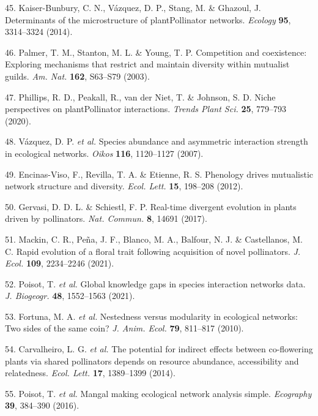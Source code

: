 \documentclass[12pt,a4paper,]{article}
\begin{document}
\hypertarget{ref-kaiser2014}{}
45. Kaiser-Bunbury, C. N., Vázquez, D. P., Stang, M. \& Ghazoul, J.
Determinants of the microstructure of plantPollinator networks.
\emph{Ecology} \textbf{95}, 3314--3324 (2014).

\hypertarget{ref-palmer2003}{}
46. Palmer, T. M., Stanton, M. L. \& Young, T. P. Competition and
coexistence: Exploring mechanisms that restrict and maintain diversity
within mutualist guilds. \emph{Am. Nat.} \textbf{162}, S63--S79 (2003).

\hypertarget{ref-phillips2020}{}
47. Phillips, R. D., Peakall, R., van der Niet, T. \& Johnson, S. D.
Niche perspectives on plantPollinator interactions. \emph{Trends Plant
Sci.} \textbf{25}, 779--793 (2020).

\hypertarget{ref-vazquez2007}{}
48. Vázquez, D. P. \emph{et al.} Species abundance and asymmetric
interaction strength in ecological networks. \emph{Oikos} \textbf{116},
1120--1127 (2007).

\hypertarget{ref-encinas2012}{}
49. Encinas-Viso, F., Revilla, T. A. \& Etienne, R. S. Phenology drives
mutualistic network structure and diversity. \emph{Ecol. Lett.}
\textbf{15}, 198--208 (2012).

\hypertarget{ref-gervasi2017}{}
50. Gervasi, D. D. L. \& Schiestl, F. P. Real-time divergent evolution
in plants driven by pollinators. \emph{Nat. Commun.} \textbf{8}, 14691
(2017).

\hypertarget{ref-mackin2021}{}
51. Mackin, C. R., Peña, J. F., Blanco, M. A., Balfour, N. J. \&
Castellanos, M. C. Rapid evolution of a floral trait following
acquisition of novel pollinators. \emph{J. Ecol.} \textbf{109},
2234--2246 (2021).

\hypertarget{ref-poisot2021}{}
52. Poisot, T. \emph{et al.} Global knowledge gaps in species
interaction networks data. \emph{J. Biogeogr.} \textbf{48}, 1552--1563
(2021).

\hypertarget{ref-fortuna2010}{}
53. Fortuna, M. A. \emph{et al.} Nestedness versus modularity in
ecological networks: Two sides of the same coin? \emph{J. Anim. Ecol.}
\textbf{79}, 811--817 (2010).

\hypertarget{ref-carvalheiro2014}{}
54. Carvalheiro, L. G. \emph{et al.} The potential for indirect effects
between co-flowering plants via shared pollinators depends on resource
abundance, accessibility and relatedness. \emph{Ecol. Lett.}
\textbf{17}, 1389--1399 (2014).

\hypertarget{ref-poisot2016}{}
55. Poisot, T. \emph{et al.} Mangal making ecological network analysis
simple. \emph{Ecography} \textbf{39}, 384--390 (2016).
\end{document}
